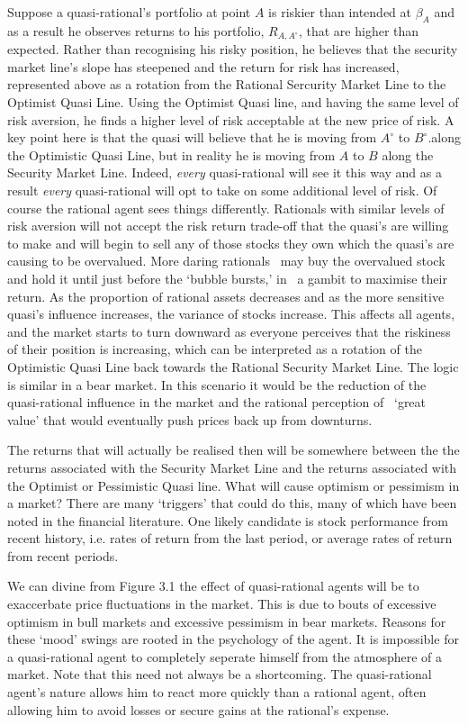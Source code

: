 \documentclass{ucthesis}
\begin{document}
Suppose a quasi-rational's portfolio at point $A$ is riskier than intended
at $\beta _{A}$ and as a result he observes returns to his portfolio, $%
R_{A,A^{\circ }}$, that are higher than expected. Rather than recognising
his risky position, he believes that the security market line's slope has
steepened and the return for risk has increased, represented above as a
rotation from the Rational Sercurity Market Line to the Optimist Quasi Line.
Using the Optimist Quasi line, and having the same level of risk aversion,
he finds a higher level of risk acceptable at the new price of risk. A key
point here is that the quasi will believe that he is moving from $A^{\circ }$
to $B^{\circ }$.along the Optimistic Quasi Line, but in reality he is moving
from $A$ to $B$ along the Security Market Line. Indeed, \textit{every}
quasi-rational will see it this way and as a result \textit{every}
quasi-rational will opt to take on some additional level of risk. Of course
the rational agent sees things differently. Rationals with similar levels of
risk aversion will not accept the risk return trade-off that the quasi's are
willing to make and will begin to sell any of those stocks they own which
the quasi's are causing to be overvalued. More daring rationals \ may buy
the overvalued stock and hold it until just before the `bubble bursts,' in \
a gambit to maximise their return. As the proportion of rational assets
decreases and as the more sensitive quasi's influence increases, the
variance of stocks increase. This affects all agents, and the market starts
to turn downward as everyone perceives that the riskiness of their position
is increasing, which can be interpreted as a rotation of the Optimistic
Quasi Line back towards the Rational Security Market Line. The logic is
similar in a bear market. In this scenario it would be the reduction of the
quasi-rational influence in the market and the rational perception of \
`great value' that would eventually push prices back up from downturns.

The returns that will actually be realised then will be somewhere between
the the returns associated with the Security Market Line and the returns
associated with the Optimist or Pessimistic Quasi line. What will cause
optimism or pessimism in a market? There are many `triggers' that could do
this, many of which have been noted in the financial literature. One likely
candidate is stock performance from recent history, i.e. rates of return
from the last period, or average rates of return from recent periods.

We can divine from Figure 3.1 the effect of quasi-rational agents will be to
exaccerbate price fluctuations in the market. This is due to bouts of
excessive optimism in bull markets and excessive pessimism in bear markets.
Reasons for these `mood' swings are rooted in the psychology of the agent.
It is impossible for a quasi-rational agent to completely seperate himself
from the atmosphere of a market. Note that this need not always be a
shortcoming. The quasi-rational agent's nature allows him to react more
quickly than a rational agent, often allowing him to avoid losses or secure
gains at the rational's expense.
\end{document}
